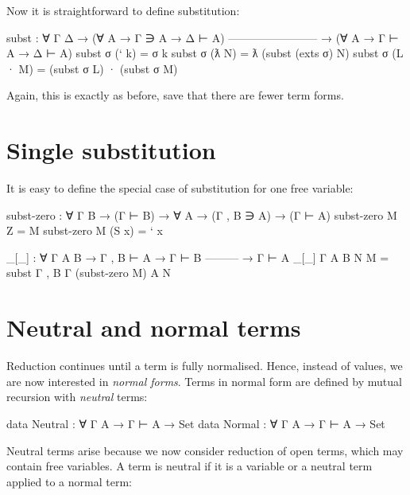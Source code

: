 Now it is straightforward to define substitution:

\begin{fence}
\begin{code}
subst : ∀ {Γ Δ}
  → (∀ {A} → Γ ∋ A → Δ ⊢ A)
    ------------------------
  → (∀ {A} → Γ ⊢ A → Δ ⊢ A)
subst σ (` k)          =  σ k
subst σ (ƛ N)          =  ƛ (subst (exts σ) N)
subst σ (L · M)        =  (subst σ L) · (subst σ M)
\end{code}
\end{fence}

Again, this is exactly as before, save that there are fewer term forms.

\hypertarget{single-substitution}{%
\section{Single substitution}\label{single-substitution}}

It is easy to define the special case of substitution for one free
variable:

\begin{fence}
\begin{code}
subst-zero : ∀ {Γ B} → (Γ ⊢ B) → ∀ {A} → (Γ , B ∋ A) → (Γ ⊢ A)
subst-zero M Z      =  M
subst-zero M (S x)  =  ` x

_[_] : ∀ {Γ A B}
        → Γ , B ⊢ A
        → Γ ⊢ B
          ---------
        → Γ ⊢ A
_[_] {Γ} {A} {B} N M =  subst {Γ , B} {Γ} (subst-zero M) {A} N
\end{code}
\end{fence}

\hypertarget{neutral-and-normal-terms}{%
\section{Neutral and normal terms}\label{neutral-and-normal-terms}}

Reduction continues until a term is fully normalised. Hence, instead of
values, we are now interested in \emph{normal forms}. Terms in normal
form are defined by mutual recursion with \emph{neutral} terms:

\begin{fence}
\begin{code}
data Neutral : ∀ {Γ A} → Γ ⊢ A → Set
data Normal  : ∀ {Γ A} → Γ ⊢ A → Set
\end{code}
\end{fence}

Neutral terms arise because we now consider reduction of open terms,
which may contain free variables. A term is neutral if it is a variable
or a neutral term applied to a normal term:

